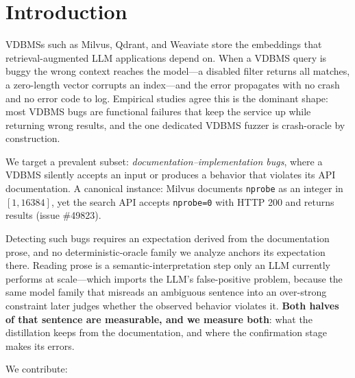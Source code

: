 \documentclass[acmsmall,screen,review,anonymous]{acmart}
\begin{document}
\section{Introduction}
\label{sec:intro}

VDBMSs such as Milvus, Qdrant, and Weaviate store the embeddings that retrieval-augmented LLM
applications depend on. When a VDBMS query is buggy the wrong context reaches the model---a disabled
filter returns all matches, a zero-length vector corrupts an index---and the error propagates with
no crash and no error code to log. Empirical studies agree this is the dominant shape: most VDBMS
bugs are functional failures that keep the service up while returning wrong results, and the one
dedicated VDBMS fuzzer is crash-oracle by construction.

We target a prevalent subset: \emph{documentation--implementation bugs}, where a VDBMS silently
accepts an input or produces a behavior that violates its API documentation. A canonical instance:
Milvus documents \texttt{nprobe} as an integer in $[1, 16384]$, yet the search API accepts
\texttt{nprobe=0} with HTTP 200 and returns results (issue \#49823).

Detecting such bugs requires an expectation derived from the documentation prose, and no
deterministic-oracle family we analyze anchors its expectation there. Reading prose is a
semantic-interpretation step only an LLM currently performs at scale---which imports the LLM's
false-positive problem, because the same model family that misreads an ambiguous sentence into an
over-strong constraint later judges whether the observed behavior violates it. \textbf{Both halves
of that sentence are measurable, and we measure both}: what the distillation keeps from the
documentation, and where the confirmation stage makes its errors.

We contribute:
\end{document}
